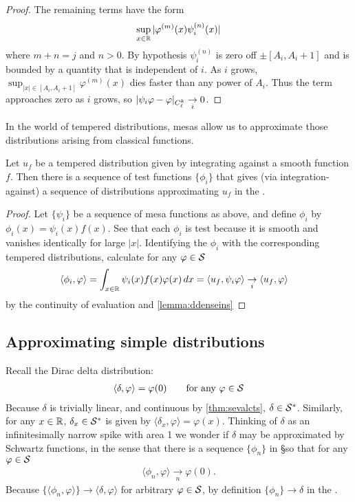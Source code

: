 \begin{proof}
      The remaining terms have the form
      \begin{align*}
        \sup_{x\in\R} |\varphi^{(m)}(x)\psi_i^{(n)}(x)|
      \end{align*}
      where $m+n=j$ and $n>0$.
      By hypothesis $\psi_i^{(n)}$ is zero off $\pm[A_i,A_i+1]$ and is bounded by a quantity that is independent of $i$.
      As $i$ grows, $\sup_{|x|\in[A_i,A_i+1]}\varphi^{(m)}(x)$ dies faster than any power of $A_i$.
      Thus the term approaches zero as $i$ grows, so $|\psi_i\varphi-\varphi|_\Ckl \underset{i}{\rightarrow}0$.
    \end{proof}
    In the world of tempered distributions, mesas allow us to approximate those distributions arising from classical functions.
    \begin{lemma}
      \label{lemma:ddenseinssfromsmooth}
      Let $u_f$ be a tempered distribution given by integrating against a smooth function $f$.
      Then there is a sequence of test functions $\{\phi_i\}$ that gives (via integration-against) a sequence of distributions approximating $u_f$ in the \ws.
    \end{lemma}
    \begin{proof}
      Let $\{\psi_i\}$ be a sequence of mesa functions as above, and define $\phi_i$ by $\phi_i(x) = \psi_i(x)f(x)$.
      See that each $\phi_i$ is test because it is smooth and vanishes identically for large $|x|$.
      Identifying the $\phi_i$ with the corresponding tempered distributions, calculate for any $\varphi\in\S$
      \begin{align*}
        \langle \phi_i, \varphi\rangle
        &= \int_{x\in\R} \psi_i(x)f(x)\varphi(x)\,dx
        = \langle u_f, \psi_i\varphi\rangle
        \underset{i}{\rightarrow} \langle u_f, \varphi\rangle
      \end{align*}
      by the continuity of evaluation and \cref{lemma:ddenseins}
    \end{proof}

  \subsection{Approximating simple distributions}
    Recall the Dirac delta distribution:
    \begin{gather*}
      \langle\delta,\varphi\rangle = \varphi(0)
      \qquad\text{for any }\varphi\in\S
    \end{gather*}
    Because $\delta$ is trivially linear, and continuous by \cref{thm:sevalcts}, $\delta\in\SS$.
    Similarly, for any $x\in\R$, $\delta_x\in\SS$ is given by $\langle\delta_x,\varphi\rangle=\varphi(x)$.
    Thinking of $\delta$ as an infinitesimally narrow spike with area 1 we wonder if $\delta$ may be approximated by Schwartz functions, in the sense that there is a sequence $\{\phi_n\}$ in \S so that for any $\varphi\in\S$
    \begin{align*}
      \langle \phi_n, \varphi\rangle \underset{n}{\longrightarrow} \varphi(0)\text{.}
    \end{align*}
    Because $\{\langle\phi_n,\varphi\rangle\}\rightarrow\langle\delta,\varphi\rangle$ for arbitrary $\varphi\in\S$, by definition $\{\phi_n\}\rightarrow\delta$ in the \ws.

